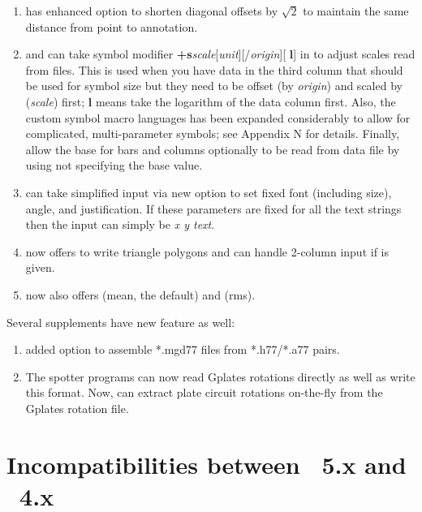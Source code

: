\begin{enumerate}
	\item {} has enhanced  option to shorten diagonal offsets by $\sqrt{2}$ to
		maintain the same distance from point to annotation.
	\item {} and  can take symbol modifier \textbf{+s}\emph{scale}[\emph{unit}][/\emph{origin}][{ \bf l}]
		in  to adjust scales read from files.  This is used when you have data in the third column that should be
		used for symbol size but they need to be offset (by \emph{origin}) and scaled by (\emph{scale}) first; \textbf{l} means
		take the logarithm of the data column first.  Also, the custom symbol macro languages has been expanded considerably
		to allow for complicated, multi-parameter symbols; see Appendix N for details.
		Finally, allow the base for bars and columns optionally to be read from data file by using not specifying the base value.
	\item {} can take simplified input via new option  to set fixed font (including size), angle, and justification.  If
		these parameters are fixed for all the text strings then the input can simply be \emph{x y text}.
	\item {} now offers  to write triangle polygons and can handle 2-column input if  is given.
	\item {} now also offers  (mean, the default) and  (rms).
	
\end{enumerate}

\noindent
Several supplements have new feature as well:

\begin{enumerate}
	\item {} added  option to assemble *.mgd77 files from *.h77/*.a77 pairs.
	\item The spotter programs can now read Gplates rotations directly as well as write this format.
		Now,  can extract plate circuit rotations on-the-fly from the Gplates rotation file.
\end{enumerate}

\section{Incompatibilities between \gmt\ 5.x and \gmt\ 4.x}

